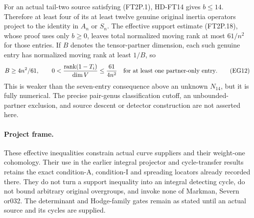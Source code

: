 For an actual tail-two source satisfying (FT2P.1), HD-FT14 gives
$b\leq14$. Therefore at least four of its at least twelve genuine
original inertia operators project to the identity in $A_n$ or
$S_n$. The effective support estimate (FT2P.18), whose proof uses
only $b\geq0$, leaves total normalized moving rank at most $61/n^2$
for those entries. If $B$ denotes the tensor-partner dimension,
each such genuine entry has normalized moving rank at least $1/B$, so
\[
             B\geq4n^2/61,
 \qquad
 0<\frac{\operatorname{rank}(1-T_i)}{\dim V}
                       \leq\frac{61}{4n^2}
 \quad\hbox{for at least one partner-only entry}.  \tag{EG12}
\]
This is weaker than the seven-entry consequence above an unknown
$N_{14}$, but it is fully numerical. The precise pair-genus
classification cutoff, an unbounded-partner exclusion, and source
descent or detector construction are not asserted here.

\paragraph{Project frame.}
These effective inequalities constrain actual curve suppliers and
their weight-one cohomology. Their use in the earlier integral
projector and cycle-transfer results retains the exact condition-A,
condition-I and spreading locators already recorded there. They
do not turn a support inequality into an integral detecting cycle,
do not bound arbitrary original overgroups, and invoke none of
Markman, Severn or032. The determinant and Hodge-family gates
remain as stated until an actual source and its cycles are supplied.
